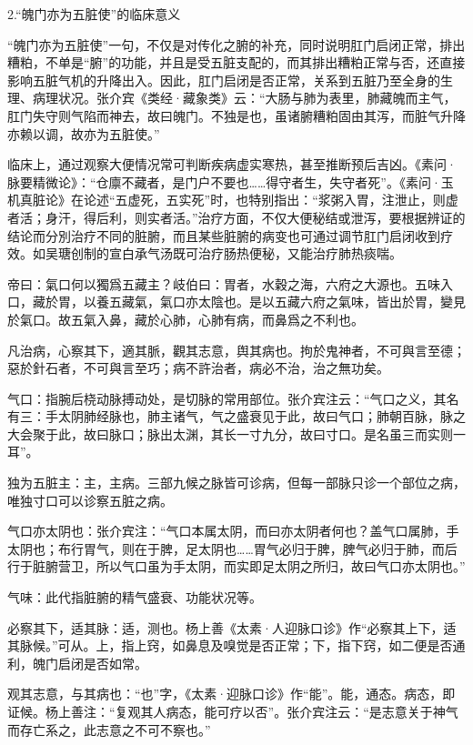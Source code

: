 \documentclass[12pt]{ctexbook}
\begin{document}
2.“魄门亦为五脏使”的临床意义

“魄门亦为五脏使”一句，不仅是对传化之腑的补充，同时说明肛门启闭正常，排出糟粕，不单是“腑”的功能，并且是受五脏支配的，而其排出糟粕正常与否，还直接影响五脏气机的升降出入。因此，肛门启闭是否正常，关系到五脏乃至全身的生理、病理状况。张介宾《类经·藏象类》云：“大肠与肺为表里，肺藏魄而主气，肛门失守则气陷而神去，故曰魄门。不独是也，虽诸腑糟粕固由其泻，而脏气升降亦赖以调，故亦为五脏使。”

临床上，通过观察大便情况常可判断疾病虚实寒热，甚至推断预后吉凶。《素问·脉要精微论》：“仓廪不藏者，是门户不要也……得守者生，失守者死”。《素问·玉机真脏论》在论述“五虚死，五实死”时，也特别指出：“浆粥入胃，注泄止，则虚者活；身汗，得后利，则实者活。”治疗方面，不仅大便秘结或泄泻，要根据辨证的结论而分別治疗不同的脏腑，而且某些脏腑的病变也可通过调节肛门启闭收到疗效。如吴瑭创制的宣白承气汤既可治疗肠热便秘，又能治疗肺热痰喘。


\begin{yuanwen}
帝曰：氣口何以獨爲五藏主？岐伯曰：胃者，水穀之海，六府之大源也。五味入口，藏於胃，以養五藏氣，氣口亦太陰也。是以五藏六府之氣味，皆出於胃，變見於氣口。故五氣入鼻，藏於心肺，心肺有病，而鼻爲之不利也。

凡治病，心察其下，適其脈，觀其志意，舆其病也。拘於鬼神者，不可與言至德；惡於針石者，不可與言至巧；病不許治者，病必不治，治之無功矣。
\end{yuanwen}


\begin{jiaozhu}
	\item 气口：指腕后桡动脉搏动处，是切脉的常用部位。张介宾注云：“气口之义，其名有三：手太阴肺经脉也，肺主诸气，气之盛衰见于此，故曰气口；肺朝百脉，脉之大会聚于此，故曰脉口；脉出太渊，其长一寸九分，故曰寸口。是名虽三而实则一耳”。
	\item 独为五脏主：主，主病。三部九候之脉皆可诊病，但每一部脉只诊一个部位之病，唯独寸口可以诊察五脏之病。
	\item 气口亦太阴也：张介宾注：“气口本属太阴，而曰亦太阴者何也？盖气口属肺，手太阴也；布行胃气，则在于脾，足太阴也……胃气必归于脾，脾气必归于肺，而后行于脏腑营卫，所以气口虽为手太阴，而实即足太阴之所归，故曰气口亦太阴也。”
	\item 气味：此代指脏腑的精气盛衰、功能状况等。
	\item 必察其下，适其脉：适，测也。杨上善《太素·人迎脉口诊》作“必察其上下，适其脉候。”可从。上，指上窍，如鼻息及嗅觉是否正常；下，指下窍，如二便是否通利，魄门启闭是否如常。
	\item 观其志意，与其病也：“也”字，《太素·迎脉口诊》作“能”。能，通态。病态，即证候。杨上善注：“复观其人病态，能可疗以否”。张介宾注云：“是志意关于神气而存亡系之，此志意之不可不察也。”
\end{jiaozhu}
\end{document}
